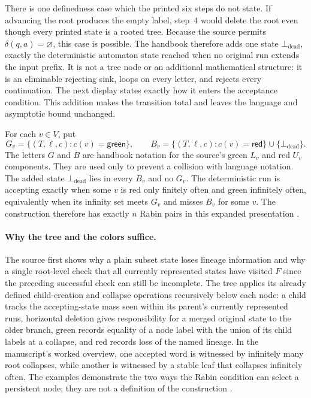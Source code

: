 There is one definedness case which the printed six steps do not state.  If
advancing the root produces the empty label, step~4 would delete the root even
though every printed state is a rooted tree.  Because the source permits
\(\delta(q,a)=\varnothing\), this case is possible.  The handbook therefore
adds one state \(\bot_{\mathrm{dead}}\), exactly the deterministic automaton
state reached when no original run extends the input prefix.  It is not a tree
node or an additional mathematical structure: it is an eliminable rejecting
sink, loops on every letter, and rejects every continuation.  The next display
states exactly how it enters the acceptance condition.  This addition makes
the transition total and leaves the language and asymptotic bound unchanged.

For each \(v\in V\), put
\[
  G_v=\{(T,\ell,c):c(v)=\mathsf{green}\},
  \qquad
  B_v=\{(T,\ell,c):c(v)=\mathsf{red}\}\cup
      \{\bot_{\mathrm{dead}}\}.
\]
The letters \(G\) and \(B\) are handbook notation for the source's green
\(L_v\) and red \(U_v\) components.  They are used only to prevent a collision
with language notation.  The added state \(\bot_{\mathrm{dead}}\) lies in every
\(B_v\) and no \(G_v\).  The deterministic run is accepting exactly when
some \(v\) is red only finitely often and green infinitely often, equivalently
when its infinity set meets \(G_v\) and misses \(B_v\) for some \(v\).  The
construction therefore has exactly \(n\) Rabin pairs in this expanded
presentation
\cite[p.~11]{Safra1995Extended}.

\paragraph{Why the tree and the colors suffice.}
The source first shows why a plain subset state loses lineage information and
why a single root-level check that all currently represented states have
visited \(F\) since the preceding successful check can still be incomplete.
The tree applies its already defined child-creation and collapse operations
recursively below each node: a child tracks the accepting-state mass seen
within its parent's currently represented runs, horizontal deletion gives
responsibility for a merged original state to the older branch, green records
equality of a node label with the union of its child labels at a collapse, and
red records loss of the named lineage.  In the manuscript's worked overview,
one accepted word is witnessed
by infinitely many root collapses, while another is witnessed by a stable leaf
that collapses infinitely often.  The examples demonstrate the two ways the
Rabin condition can select a persistent node; they are not a definition of the
construction
\cite[pp.~5--9]{Safra1995Extended}.

